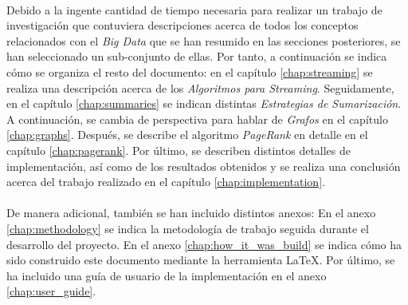 \documentclass{subfiles}
\begin{document}
    \paragraph{}
    Debido a la ingente cantidad de tiempo necesaria para realizar un trabajo de investigación que contuviera descripciones acerca de todos los conceptos relacionados con el \emph{Big Data} que se han resumido en las secciones posteriores, se han seleccionado un sub-conjunto de ellas. Por tanto, a continuación se indica cómo se organiza el resto del documento: en el capítulo \ref{chap:streaming} se realiza una descripción acerca de los \emph{Algoritmos para Streaming}. Seguidamente, en el capítulo \ref{chap:summaries} se indican distintas \emph{Estrategias de Sumarización}. A continuación, se cambia de perspectiva para hablar de \emph{Grafos} en el capítulo \ref{chap:graphs}. Después, se describe el algoritmo \emph{PageRank} en detalle en el capítulo \ref{chap:pagerank}. Por último, se describen distintos detalles de implementación, así como de los resultados obtenidos y se realiza una conclusión acerca del trabajo realizado en el capítulo \ref{chap:implementation}.

    \paragraph{}
    De manera adicional, también se han incluido distintos anexos: En el anexo \ref{chap:methodology} se indica la metodología de trabajo seguida durante el desarrollo del proyecto. En el anexo \ref{chap:how_it_was_build} se indica cómo ha sido construido este documento mediante la herramienta \LaTeX. Por último, se ha incluido una guía de usuario de la implementación en el anexo \ref{chap:user_guide}.
\end{document}
